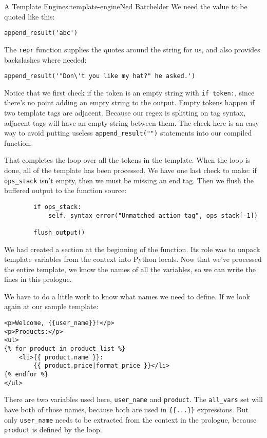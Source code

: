\begin{aosachapter}{A Template Engine}{s:template-engine}{Ned Batchelder}
We need the value to be quoted like this:

\begin{verbatim}
append_result('abc')
\end{verbatim}

The \texttt{repr} function supplies the quotes around the string for us,
and also provides backslashes where needed:

\begin{verbatim}
append_result('"Don\'t you like my hat?" he asked.')
\end{verbatim}

Notice that we first check if the token is an empty string with
\texttt{if token:}, since there's no point adding an empty string to the
output. Empty tokens happen if two template tags are adjacent. Because
our regex is splitting on tag syntax, adjacent tags will have an empty
string between them. The check here is an easy way to avoid putting
useless \texttt{append\_result("")} statements into our compiled
function.

That completes the loop over all the tokens in the template. When the
loop is done, all of the template has been processed. We have one last
check to make: if \texttt{ops\_stack} isn't empty, then we must be
missing an end tag. Then we flush the buffered output to the function
source:

\begin{verbatim}
        if ops_stack:
            self._syntax_error("Unmatched action tag", ops_stack[-1])

        flush_output()
\end{verbatim}

We had created a section at the beginning of the function. Its role was
to unpack template variables from the context into Python locals. Now
that we've processed the entire template, we know the names of all the
variables, so we can write the lines in this prologue.

We have to do a little work to know what names we need to define. If we
look again at our sample template:

\begin{verbatim}
<p>Welcome, {{user_name}}!</p>
<p>Products:</p>
<ul>
{% for product in product_list %}
    <li>{{ product.name }}:
        {{ product.price|format_price }}</li>
{% endfor %}
</ul>
\end{verbatim}

There are two variables used here, \texttt{user\_name} and
\texttt{product}. The \texttt{all\_vars} set will have both of those
names, because both are used in \texttt{\{\{...\}\}} expressions. But
only \texttt{user\_name} needs to be extracted from the context in the
prologue, because \texttt{product} is defined by the loop.


\end{aosachapter}
